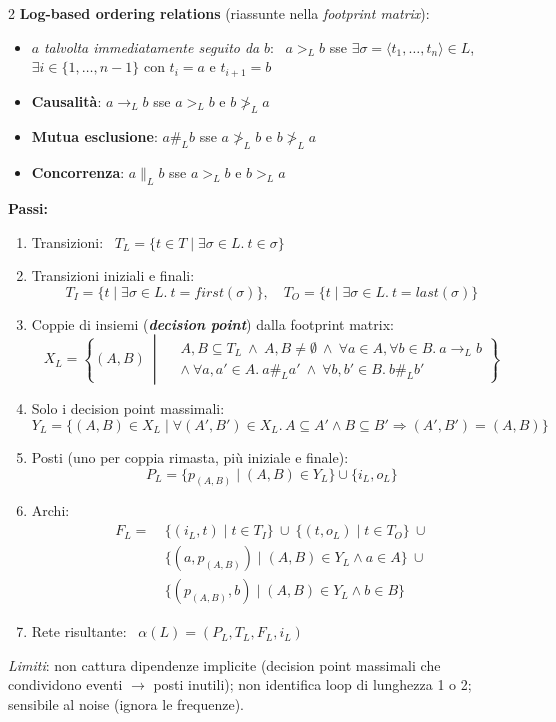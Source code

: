 \documentclass[8pt,a4paper]{extarticle}
\newcommand{\D}[1]{\textbf{\textit{#1}}}
\begin{document}
\begin{multicols*}{2}
\textbf{Log-based ordering relations} (riassunte nella \emph{footprint matrix}):
\begin{itemize}
\item $a$ \emph{talvolta immediatamente seguito da} $b$: \ $a>_L b$ sse $\exists\sigma=\langle t_1,\dots,t_n\rangle\in L$, $\exists i\in\{1,\dots,n-1\}$ con $t_i=a$ e $t_{i+1}=b$
\item \textbf{Causalità}: $a\rightarrow_L b$ sse $a>_L b$ e $b\not>_L a$
\item \textbf{Mutua esclusione}: $a\#_L b$ sse $a\not>_L b$ e $b\not>_L a$
\item \textbf{Concorrenza}: $a\parallel_L b$ sse $a>_L b$ e $b>_L a$
\end{itemize}
\textbf{Passi:}
\begin{enumerate}
\item Transizioni: \ $T_L=\{t\in T\mid \exists\sigma\in L.\ t\in\sigma\}$
\item Transizioni iniziali e finali:
\[T_I=\{t\mid\exists\sigma\in L.\ t=first(\sigma)\},\quad T_O=\{t\mid\exists\sigma\in L.\ t=last(\sigma)\}\]
\item Coppie di insiemi (\D{decision point}) dalla footprint matrix:
\[X_L=\left\{(A,B)\ \middle|\ \begin{aligned}&A,B\subseteq T_L\ \wedge\ A,B\neq\emptyset\ \wedge\ \forall a\in A,\forall b\in B.\ a\rightarrow_L b\\ &\wedge\ \forall a,a'\in A.\ a\#_L a'\ \wedge\ \forall b,b'\in B.\ b\#_L b'\end{aligned}\right\}\]
\item Solo i decision point massimali:
\[Y_L=\{(A,B)\in X_L\mid\forall (A',B')\in X_L.\,A\!\subseteq\!A'\wedge B\!\subseteq\!B'\Rightarrow(A',B')\!=\!(A,B)\}\]
\item Posti (uno per coppia rimasta, più iniziale e finale):
\[P_L=\{p_{(A,B)}\mid (A,B)\in Y_L\}\cup\{i_L,o_L\}\]
\item Archi:
\[\begin{aligned}F_L=\ &\{(i_L,t)\mid t\in T_I\}\ \cup\ \{(t,o_L)\mid t\in T_O\}\ \cup\\ &\{(a,p_{(A,B)})\mid (A,B)\in Y_L\wedge a\in A\}\ \cup\\ &\{(p_{(A,B)},b)\mid (A,B)\in Y_L\wedge b\in B\}\end{aligned}\]
\item Rete risultante: \ $\alpha(L)=(P_L,T_L,F_L,i_L)$
\end{enumerate}
\emph{Limiti}: non cattura dipendenze implicite (decision point massimali che condividono eventi $\to$ posti inutili); non identifica loop di lunghezza 1 o 2; sensibile al noise (ignora le frequenze).

\end{multicols*}
\end{document}
